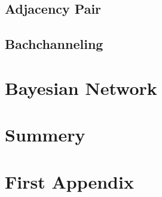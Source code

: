 \documentclass[12pt, a4paper, fleqn]{memoir}%
\begin{document}
\section{Adjacency Pair}
\label{sec:AdjacencyPair}

\section{Bachchanneling}
\label{sec:Bachchanneling}

\chapter{Bayesian Network}
\label{chap:BayesianNetwork}

\chapter{Summery}
\label{Summery}


{\small}

\appendix
\appendixpage*
\chapter{First Appendix}

\backmatter
\end{document}

